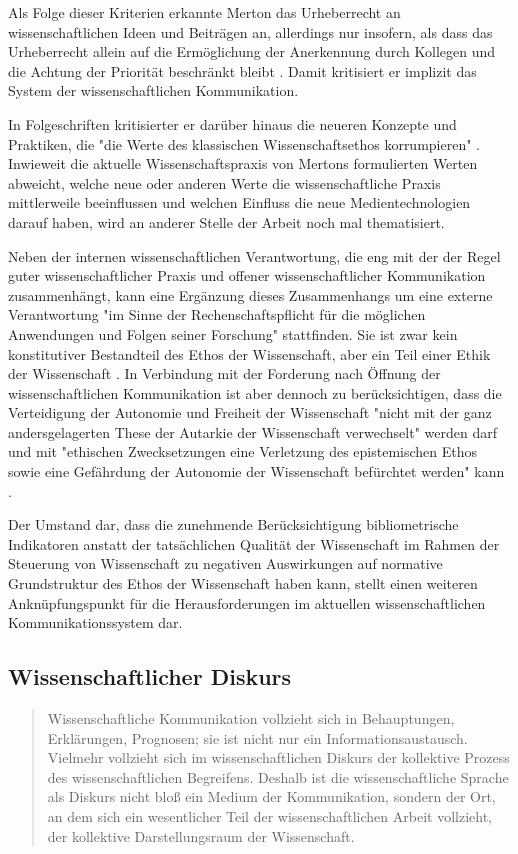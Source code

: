 Als Folge dieser Kriterien erkannte Merton das Urheberrecht an wissenschaftlichen Ideen und Beiträgen an, allerdings nur insofern, als dass das Urheberrecht allein auf die Ermöglichung der Anerkennung durch Kollegen und die Achtung der Priorität beschränkt bleibt \cite{Fangerau_2014}. Damit kritisiert er implizit das System der wissenschaftlichen Kommunikation.

In Folgeschriften kritisierter er darüber hinaus die neueren Konzepte und Praktiken, die "die Werte des klassischen Wissenschaftsethos korrumpieren" \cite{Fröhlich_oa_2009}. Inwieweit die aktuelle Wissenschaftspraxis von Mertons formulierten Werten abweicht, welche neue oder anderen Werte die wissenschaftliche Praxis mittlerweile beeinflussen und welchen Einfluss die neue Medientechnologien darauf haben, wird an anderer Stelle der Arbeit noch mal thematisiert.

Neben der internen wissenschaftlichen Verantwortung, die eng mit der der Regel guter wissenschaftlicher Praxis und offener wissenschaftlicher Kommunikation zusammenhängt, kann eine Ergänzung dieses Zusammenhangs um eine externe Verantwortung "im Sinne der Rechenschaftspflicht für die möglichen Anwendungen und Folgen seiner Forschung" \cite{Oezmen_2015} stattfinden. Sie ist zwar kein konstitutiver Bestandteil des Ethos der Wissenschaft, aber ein Teil einer Ethik der Wissenschaft \cite{Oezmen_2015}. In Verbindung mit der Forderung nach Öffnung der wissenschaftlichen Kommunikation ist aber dennoch zu berücksichtigen, dass die Verteidigung der Autonomie und Freiheit der Wissenschaft "nicht mit der ganz andersgelagerten These der Autarkie der Wissenschaft verwechselt" werden darf und mit "ethischen Zwecksetzungen eine Verletzung des epistemischen Ethos sowie eine Gefährdung der Autonomie der Wissenschaft befürchtet werden" kann \cite{Oezmen_2015}.

Der Umstand dar, dass die zunehmende Berücksichtigung bibliometrische Indikatoren anstatt der tatsächlichen Qualität der Wissenschaft im Rahmen der Steuerung von Wissenschaft zu negativen Auswirkungen auf normative Grundstruktur des Ethos der Wissenschaft haben kann, stellt einen weiteren Anknüpfungspunkt für die Herausforderungen im aktuellen wissenschaftlichen Kommunikationssystem dar.

\subsection{Wissenschaftlicher Diskurs}

\begin{quote}Wissenschaftliche Kommunikation vollzieht sich in Behauptungen, Erklärungen, Prognosen; sie ist nicht nur ein Informationsaustausch. Vielmehr vollzieht sich im wissenschaftlichen Diskurs der kollektive Prozess des wissenschaftlichen Begreifens. Deshalb ist die wissenschaftliche Sprache als Diskurs nicht bloß ein Medium der Kommunikation, sondern der Ort, an dem sich ein wesentlicher Teil der wissenschaftlichen Arbeit vollzieht, der kollektive Darstellungsraum der Wissenschaft. \cite{bohme_1978_wissenschaftssprachen}\end{quote}

